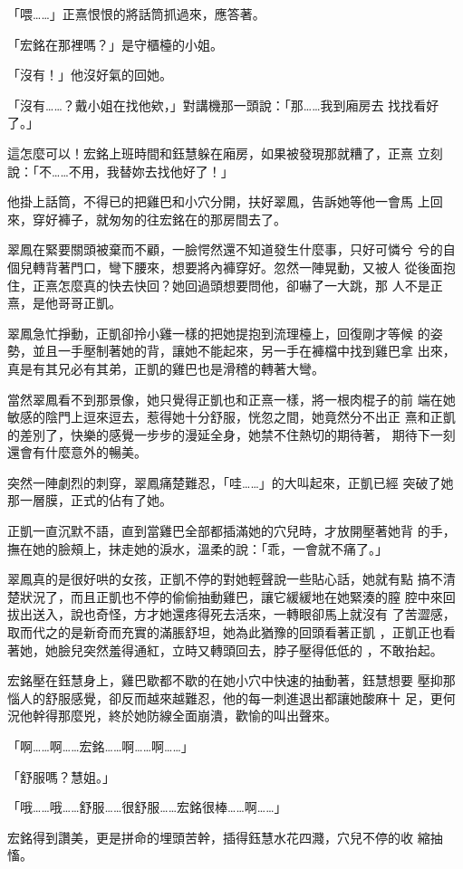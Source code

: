 「喂……」正熹恨恨的將話筒抓過來，應答著。

「宏銘在那裡嗎？」是守櫃檯的小姐。

「沒有！」他沒好氣的回她。

「沒有……？戴小姐在找他欸，」對講機那一頭說：「那……我到廂房去
找找看好了。」

這怎麼可以！宏銘上班時間和鈺慧躲在廂房，如果被發現那就糟了，正熹
立刻說：「不……不用，我替妳去找他好了！」

他掛上話筒，不得已的把雞巴和小穴分開，扶好翠鳳，告訴她等他一會馬
上回來，穿好褲子，就匆匆的往宏銘在的那房間去了。

翠鳳在緊要關頭被棄而不顧，一臉愕然還不知道發生什麼事，只好可憐兮
兮的自個兒轉背著門口，彎下腰來，想要將內褲穿好。忽然一陣晃動，又被人
從後面抱住，正熹怎麼真的快去快回？她回過頭想要問他，卻嚇了一大跳，那
人不是正熹，是他哥哥正凱。

翠鳳急忙掙動，正凱卻拎小雞一樣的把她提抱到流理檯上，回復剛才等候
的姿勢，並且一手壓制著她的背，讓她不能起來，另一手在褲檔中找到雞巴拿
出來，真是有其兄必有其弟，正凱的雞巴也是滑稽的轉著大彎。

當然翠鳳看不到那景像，她只覺得正凱也和正熹一樣，將一根肉棍子的前
端在她敏感的陰門上逗來逗去，惹得她十分舒服，恍忽之間，她竟然分不出正
熹和正凱的差別了，快樂的感覺一步步的漫延全身，她禁不住熱切的期待著，
期待下一刻還會有什麼意外的暢美。

突然一陣劇烈的刺穿，翠鳳痛楚難忍，「哇……」的大叫起來，正凱已經
突破了她那一層膜，正式的佔有了她。

正凱一直沉默不語，直到當雞巴全部都插滿她的穴兒時，才放開壓著她背
的手，撫在她的臉頰上，抹走她的淚水，溫柔的說：「乖，一會就不痛了。」

翠鳳真的是很好哄的女孩，正凱不停的對她輕聲說一些貼心話，她就有點
搞不清楚狀況了，而且正凱也不停的偷偷抽動雞巴，讓它緩緩地在她緊湊的膣
腔中來回拔出送入，說也奇怪，方才她還疼得死去活來，一轉眼卻馬上就沒有
了苦澀感，取而代之的是新奇而充實的滿脹舒坦，她為此猶豫的回頭看著正凱
，正凱正也看著她，她臉兒突然羞得通紅，立時又轉頭回去，脖子壓得低低的
，不敢抬起。

宏銘壓在鈺慧身上，雞巴歇都不歇的在她小穴中快速的抽動著，鈺慧想要
壓抑那惱人的舒服感覺，卻反而越來越難忍，他的每一刺進退出都讓她酸麻十
足，更何況他幹得那麼兇，終於她防線全面崩潰，歡愉的叫出聲來。

「啊……啊……宏銘……啊……啊……」

「舒服嗎？慧姐。」

「哦……哦……舒服……很舒服……宏銘很棒……啊……」

宏銘得到讚美，更是拼命的埋頭苦幹，插得鈺慧水花四濺，穴兒不停的收
縮抽慉。

